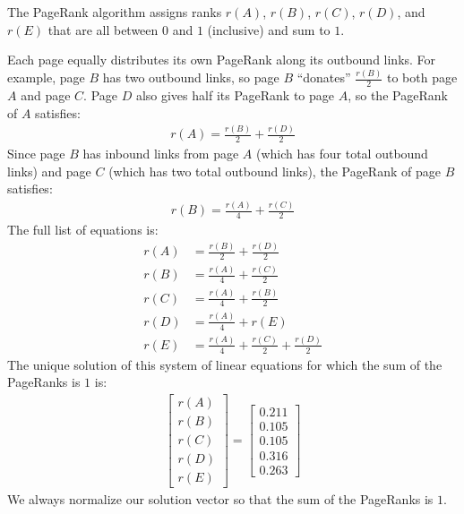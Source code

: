 \documentclass{article}
\begin{document}
\begin{center}
\end{center}

The PageRank algorithm assigns ranks $r(A)$, $r(B)$, $r(C)$, $r(D)$, and $r(E)$ that are all between $0$ and $1$ (inclusive) and sum to $1$.

Each page equally distributes its own PageRank along its outbound links. For example, page $B$ has two outbound links, so page $B$ ``donates'' $\frac{r(B)}{2}$ to both page $A$ and page $C$. Page $D$ also gives half its PageRank to page $A$, so the PageRank of $A$ satisfies:
\begin{align*}
  r(A) = \frac{r(B)}{2} + \frac{r(D)}{2}
\end{align*}
Since page $B$ has inbound links from page $A$ (which has four total outbound links) and page $C$ (which has two total outbound links), the PageRank of page $B$ satisfies:
\begin{align*}
  r(B) = \frac{r(A)}{4} + \frac{r(C)}{2}
\end{align*}
The full list of equations is:
\begin{align*}
  r(A) & = \frac{r(B)}{2} + \frac{r(D)}{2}                  \\[1ex]
  r(B) & = \frac{r(A)}{4} + \frac{r(C)}{2}                  \\[1ex]
  r(C) & = \frac{r(A)}{4} + \frac{r(B)}{2}                  \\[1ex]
  r(D) & = \frac{r(A)}{4} + r(E)                            \\[1ex]
  r(E) & = \frac{r(A)}{4} + \frac{r(C)}{2} + \frac{r(D)}{2}
\end{align*}
The unique solution of this system of linear equations for which the sum of the PageRanks is $1$ is:
\begin{align*}
  \begin{bmatrix}
    r(A) \\
    r(B) \\
    r(C) \\
    r(D) \\
    r(E)
  \end{bmatrix} = \begin{bmatrix}
                    0.211 \\
                    0.105 \\
                    0.105 \\
                    0.316 \\
                    0.263
                  \end{bmatrix}
\end{align*}
We always normalize our solution vector so that the sum of the PageRanks is $1$.
\end{document}
